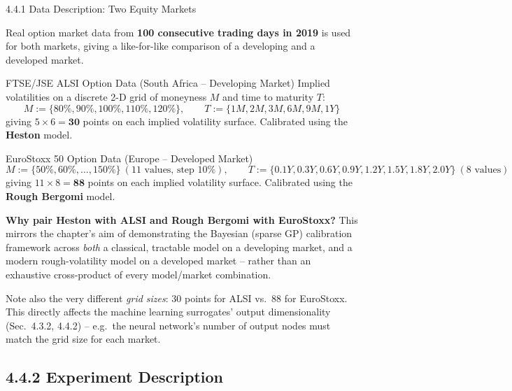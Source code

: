 \documentclass[aspectratio=169,10pt]{beamer}
\begin{document}
\begin{frame}[allowframebreaks]{4.4.1 Data Description: Two Equity Markets}

Real option market data from \textbf{100 consecutive trading days in
2019} is used for both markets, giving a like-for-like comparison of a
developing and a developed market.

\begin{block}{FTSE/JSE ALSI Option Data (South Africa -- Developing Market)}
Implied volatilities on a discrete 2-D grid of moneyness $M$ and time to
maturity $T$:
\[
  M := \{80\%, 90\%, 100\%, 110\%, 120\%\}, \qquad
  T := \{1M, 2M, 3M, 6M, 9M, 1Y\}
\]
giving $5 \times 6 = \mathbf{30}$ points on each implied volatility
surface. Calibrated using the \textbf{Heston} model.
\end{block}

\begin{block}{EuroStoxx 50 Option Data (Europe -- Developed Market)}
\[
  M := \{50\%,60\%,\ldots,150\%\}\ (11\text{ values, step }10\%), \qquad
  T := \{0.1Y, 0.3Y, 0.6Y, 0.9Y, 1.2Y, 1.5Y, 1.8Y, 2.0Y\}\ (8\text{ values})
\]
giving $11 \times 8 = \mathbf{88}$ points on each implied volatility
surface. Calibrated using the \textbf{Rough Bergomi} model.
\end{block}

\framebreak

\textbf{Why pair Heston with ALSI and Rough Bergomi with EuroStoxx?} This
mirrors the chapter's aim of demonstrating the Bayesian (sparse GP)
calibration framework across \emph{both} a classical, tractable model on
a developing market, and a modern rough-volatility model on a developed
market -- rather than an exhaustive cross-product of every
model/market combination.

Note also the very different \emph{grid sizes}: 30 points for ALSI vs.\
88 for EuroStoxx. This directly affects the machine learning surrogates'
output dimensionality (Sec.\ 4.3.2, 4.4.2) -- e.g.\ the neural network's
number of output nodes must match the grid size for each market.

\end{frame}

\subsection{4.4.2 Experiment Description}
\end{document}
